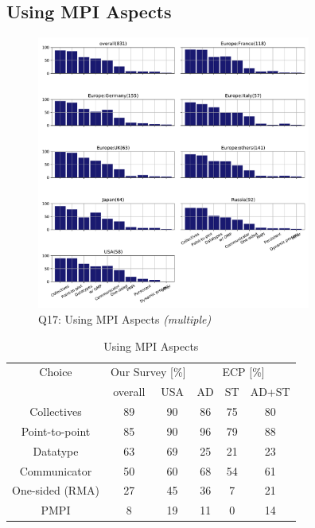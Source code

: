 \documentclass[conference,10pt,letterpaper]{IEEEtran}
\begin{document}
\subsection{Using MPI Aspects}



\begin{figure}[htb]
\begin{center}
\includegraphics[width=9cm]{Figs/Q17.pdf}
\caption{Q17: Using MPI Aspects {\it(multiple)}}
\label{fig:using-mpi-aspects}
\end{center}
\end{figure}

\begin{table}[htb]%
\begin{center}%
\caption{Using MPI Aspects}\label{tab:using-mpi-aspects}%
\begin{tabular}{c||c|c||c|c|c}%
\hline%
Choice & \multicolumn{2}{c||}{Our Survey [\%]} &
\multicolumn{3}{c}{ECP [\%]} \\
\cline{2-6}%
 & overall & USA & AD & ST & AD+ST \\
\hline%
Collectives & 89 & 90 & 86 & 75 & 80 \\
Point-to-point & 85 & 90 & 96 & 79 & 88 \\
Datatype & 63 & 69 & 25 & 21 & 23 \\
Communicator & 50 & 60 & 68 & 54 & 61 \\
One-sided (RMA) & 27 & 45 & 36 & 7 & 21 \\
PMPI & 8 & 19 & 11 & 0 & 14 \\
\hline%
\end{tabular}%
\end{center}%
\end{table}%
\end{document}
